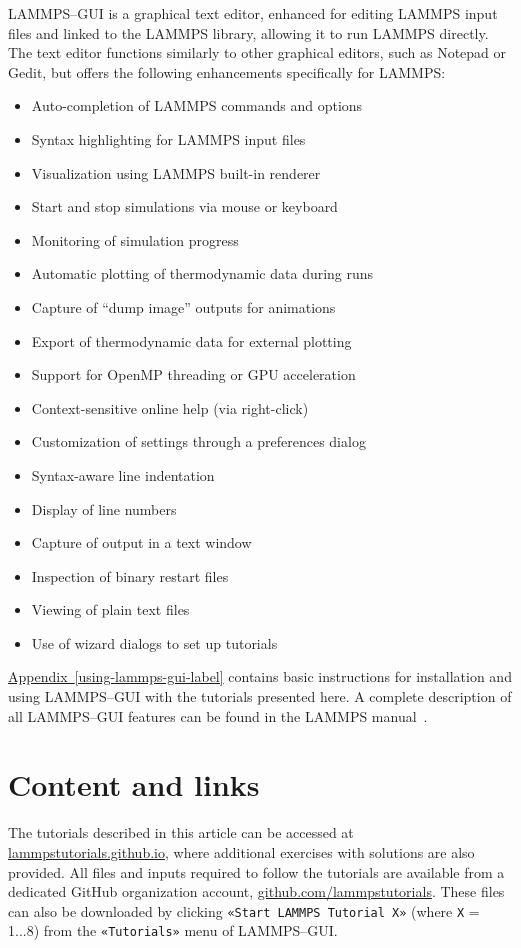 \documentclass[9pt,tutorial]{livecoms}
\newcommand{\guicmd}[1]{\textcolor{command}{\texttt{«#1»}}} %
\begin{document}
LAMMPS--GUI is a graphical text editor, enhanced for editing LAMMPS input
files and linked to the LAMMPS library, allowing it to run LAMMPS
directly.  The text editor functions similarly to other graphical editors,
such as Notepad or Gedit, but offers the following enhancements specifically for LAMMPS:
\begin{itemize}
  \item Auto-completion of LAMMPS commands and options
  \item Syntax highlighting for LAMMPS input files
  \item Visualization using LAMMPS built-in renderer
  \item Start and stop simulations via mouse or keyboard
  \item Monitoring of simulation progress
  \item Automatic plotting of thermodynamic data during runs
  \item Capture of ``dump image'' outputs for animations
  \item Export of thermodynamic data for external plotting
  \item Support for OpenMP threading or GPU acceleration
  \item Context-sensitive online help (via right-click)
  \item Customization of settings through a preferences dialog
  \item Syntax-aware line indentation
  \item Display of line numbers
  \item Capture of output in a text window
  \item Inspection of binary restart files
  \item Viewing of plain text files
  \item Use of wizard dialogs to set up tutorials
\end{itemize}
\hyperref[using-lammps-gui-label]{Appendix~\ref{using-lammps-gui-label}}
contains basic instructions for installation and using LAMMPS--GUI with
the tutorials presented here.  A complete description of all LAMMPS--GUI
features can be found in the LAMMPS manual~\cite{lammps_gui_docs}.

\section{Content and links}

The tutorials described in this article can be accessed at
\href{https://lammpstutorials.github.io}{lammpstutorials.github.io},
where additional exercises with solutions are also provided.  All files
and inputs required to follow the tutorials are available from a
dedicated GitHub organization account,
\href{https://github.com/lammpstutorials}{github.com/lammpstutorials}.
These files can also be downloaded by clicking \guicmd{Start LAMMPS Tutorial X}
(where \texttt{X} = 1...8) from the \guicmd{Tutorials} menu of LAMMPS--GUI.
\end{document}
